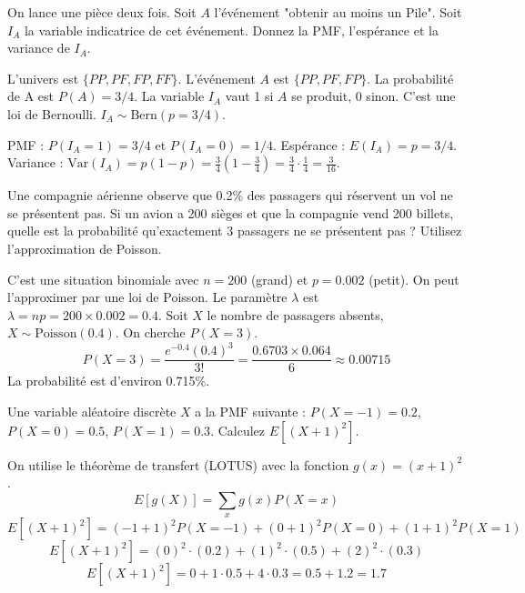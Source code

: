 \begin{exercicebox}
On lance une pièce deux fois. Soit $A$ l'événement "obtenir au moins un Pile". Soit $I_A$ la variable indicatrice de cet événement. Donnez la PMF, l'espérance et la variance de $I_A$.
\end{exercicebox}

\begin{correctionbox}
L'univers est $\{PP, PF, FP, FF\}$. L'événement $A$ est $\{PP, PF, FP\}$.
La probabilité de A est $P(A) = 3/4$.
La variable $I_A$ vaut 1 si $A$ se produit, 0 sinon. C'est une loi de Bernoulli.
$I_A \sim \text{Bern}(p=3/4)$.

PMF : $P(I_A=1) = 3/4$ et $P(I_A=0) = 1/4$.
Espérance : $E(I_A) = p = 3/4$.
Variance : $\text{Var}(I_A) = p(1-p) = \frac{3}{4} \left(1-\frac{3}{4}\right) = \frac{3}{4} \cdot \frac{1}{4} = \frac{3}{16}$.
\end{correctionbox}

\begin{exercicebox}
Une compagnie aérienne observe que 0.2\% des passagers qui réservent un vol ne se présentent pas. Si un avion a 200 sièges et que la compagnie vend 200 billets, quelle est la probabilité qu'exactement 3 passagers ne se présentent pas ? Utilisez l'approximation de Poisson.
\end{exercicebox}

\begin{correctionbox}
C'est une situation binomiale avec $n=200$ (grand) et $p=0.002$ (petit). On peut l'approximer par une loi de Poisson.
Le paramètre $\lambda$ est $\lambda = np = 200 \times 0.002 = 0.4$.
Soit $X$ le nombre de passagers absents, $X \sim \text{Poisson}(0.4)$. On cherche $P(X=3)$.
$$ P(X=3) = \frac{e^{-0.4}(0.4)^3}{3!} = \frac{0.6703 \times 0.064}{6} \approx 0.00715 $$
La probabilité est d'environ 0.715\%.
\end{correctionbox}

\begin{exercicebox}[LOTUS]
Une variable aléatoire discrète $X$ a la PMF suivante : $P(X=-1)=0.2$, $P(X=0)=0.5$, $P(X=1)=0.3$. Calculez $E[ (X+1)^2 ]$.
\end{exercicebox}

\begin{correctionbox}
On utilise le théorème de transfert (LOTUS) avec la fonction $g(x) = (x+1)^2$.
$$ E[g(X)] = \sum_x g(x) P(X=x) $$
$$ E[(X+1)^2] = (-1+1)^2 P(X=-1) + (0+1)^2 P(X=0) + (1+1)^2 P(X=1) $$
$$ E[(X+1)^2] = (0)^2 \cdot (0.2) + (1)^2 \cdot (0.5) + (2)^2 \cdot (0.3) $$
$$ E[(X+1)^2] = 0 + 1 \cdot 0.5 + 4 \cdot 0.3 = 0.5 + 1.2 = 1.7 $$
\end{correctionbox}

